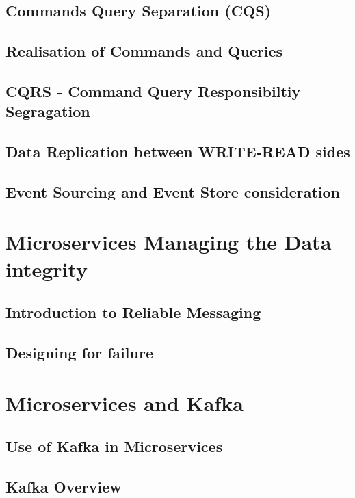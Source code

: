\documentclass[a4paper, 11pt]{book}
\begin{document}
    \section{Commands Query Separation (CQS)}


    \section{Realisation of Commands and Queries}


    \section{CQRS - Command Query Responsibiltiy Segragation}


    \section{Data Replication between WRITE-READ sides}


    \section{Event Sourcing and Event Store consideration}


    \chapter{Microservices Managing the Data integrity}


    \section{Introduction to Reliable Messaging}


    \section{Designing for failure}


    \chapter{Microservices and Kafka}


    \section{Use of Kafka in Microservices}


    \section{Kafka Overview}
\end{document}
